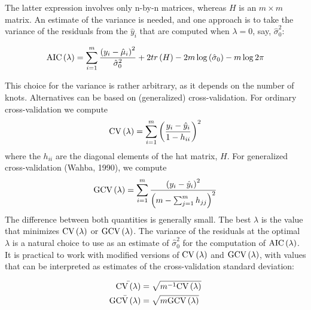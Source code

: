 \documentclass[12pt]{article}
\newcommand*\needsparaphrased{\color{red}}
\begin{document}
{\needsparaphrased The latter expression involves only n-by-n matrices, whereas $H$ is an $m \times m$ matrix. An estimate of the variance is needed, and one approach is to take the variance of the residuals from the $\hat{y}_i$ that are computed when $\lambda = 0$, say, $\hat{\sigma}_0^2$:}

\begin{equation} \label{eq:univariate_AIC}
\textup{AIC}\left(\lambda\right) = \sum_{i=1}^m \frac{\left( y_i - \hat{\mu}_i \right)^2}{\hat{\sigma}_0^2} + 2tr\left(H\right) - 2m\log\left(\hat{\sigma}_0\right) - m\log 2\pi
\end{equation}

{\needsparaphrased This choice for the variance is rather arbitrary, as it depends on the number of knots. Alternatives can be based on (generalized) cross-validation. For ordinary cross-validation we compute}
\begin{equation} \label{eq:univariate_CV}
\textup{CV}\left(\lambda\right) = \sum_{i=1}^m \left( \frac{ y_i - \hat{y}_i }{1-h_{ii}}\right)^2 
\end{equation}
{\needsparaphrased where the $h_{ii}$ are the diagonal elements of the hat matrix, $H$. For generalized cross-validation (Wahba, 1990), we compute }
\begin{equation} \label{eq:univariate_GCV}
\textup{GCV}\left(\lambda\right) = \sum_{i=1}^m \frac{\left(  y_i - \hat{y}_i \right)^2}{\left(m-\sum_{j=1}^m h_{jj}\right)^2} 
\end{equation}
{\needsparaphrased The difference between both quantities is generally small. The best $\lambda$ is the value that minimizes $\textup{CV}\left(\lambda\right)$ or $\textup{GCV}\left(\lambda\right) $. The variance of the residuals at the optimal $\lambda$ is a natural choice to use as an estimate of $\hat{\sigma}_0^2$ for the computation of $\textup{AIC}\left(\lambda\right)$. It is practical to work with modified versions of $\textup{CV}\left(\lambda\right)$ and $\textup{GCV}\left(\lambda\right)$, with values that can be interpreted as estimates of the cross-validation standard deviation:}

\begin{equation}
\begin{split}
\bar{\textup{CV}\left(\lambda\right)} &= \sqrt{m^{-1}\textup{CV}\left(\lambda\right)} \\
\bar{\textup{GCV}\left(\lambda\right)} &= \sqrt{m\textup{GCV}\left(\lambda\right)} \\
\end{split}
\end{equation}
\end{document}
